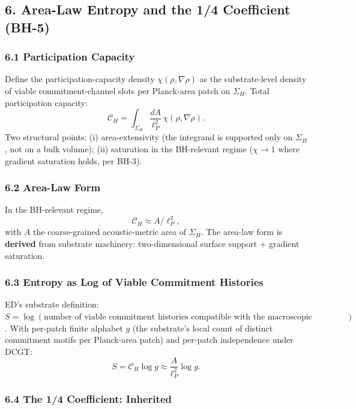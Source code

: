 \documentclass[
  11pt,
  a4paper,
]{article}
\begin{document}
\subsection{6. Area-Law Entropy and the 1/4 Coefficient
(BH-5)}\label{area-law-entropy-and-the-14-coefficient-bh-5}

\subsubsection{6.1 Participation Capacity}\label{participation-capacity}

Define the participation-capacity density \(\chi(\rho,\nabla\rho)\) as
the substrate-level density of viable commitment-channel slots per
Planck-area patch on \(\Sigma_H\). Total participation capacity: \[
\mathcal{C}_H = \int_{\Sigma_H} \frac{dA}{\ell_P^2}\,\chi(\rho,\nabla\rho).
\] Two structural points: (i) area-extensivity (the integrand is
supported only on \(\Sigma_H\), not on a bulk volume); (ii) saturation
in the BH-relevant regime (\(\chi \to 1\) where gradient saturation
holds, per BH-3).

\subsubsection{6.2 Area-Law Form}\label{area-law-form}

In the BH-relevant regime, \[
\mathcal{C}_H \approx A/\ell_P^2,
\] with \(A\) the coarse-grained acoustic-metric area of \(\Sigma_H\).
The area-law form is \textbf{derived} from substrate machinery:
two-dimensional surface support + gradient saturation.

\subsubsection{6.3 Entropy as Log of Viable Commitment
Histories}\label{entropy-as-log-of-viable-commitment-histories}

ED's substrate definition:
\(S = \log(\text{number of viable commitment histories compatible with the macroscopic constraint})\).
With per-patch finite alphabet \(g\) (the substrate's local count of
distinct commitment motifs per Planck-area patch) and per-patch
independence under DCGT: \[
S = \mathcal{C}_H \log g \approx \frac{A}{\ell_P^2}\log g.
\]

\subsubsection{6.4 The 1/4 Coefficient:
Inherited}\label{the-14-coefficient-inherited}
\end{document}
